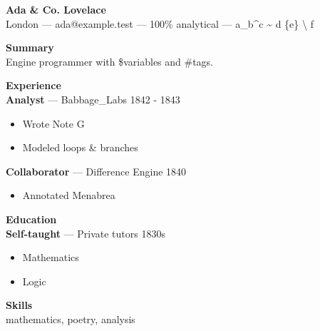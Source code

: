 \documentclass[10.5pt]{article}
\newenvironment{tightitemize}
  {\begin{itemize}\setlength{\itemsep}{1pt}\setlength{\parskip}{0pt}\setlength{\topsep}{2pt}}
  {\end{itemize}}
\begin{document}
{\LARGE \textbf{Ada \& Co. Lovelace}}\\[2pt]
London — ada@example.test — 100\% analytical — a\_b\textasciicircum{}c \textasciitilde{} d \{e\} \textbackslash{} f

\vspace{7pt}\textbf{Summary}\\
Engine programmer with \$variables and \#tags.

\vspace{7pt}\textbf{Experience}\\[2pt]
\textbf{Analyst} --- Babbage\_Labs \hfill 1842 - 1843
\begin{tightitemize}
\item Wrote Note G
\item Modeled loops \& branches
\end{tightitemize}
\textbf{Collaborator} --- Difference Engine \hfill 1840
\begin{tightitemize}
\item Annotated Menabrea
\end{tightitemize}

\vspace{7pt}\textbf{Education}\\
\textbf{Self-taught} --- Private tutors \hfill 1830s
\begin{tightitemize}
\item Mathematics
\item Logic
\end{tightitemize}

\vspace{7pt}\textbf{Skills}\\
mathematics, poetry, analysis
\end{document}
